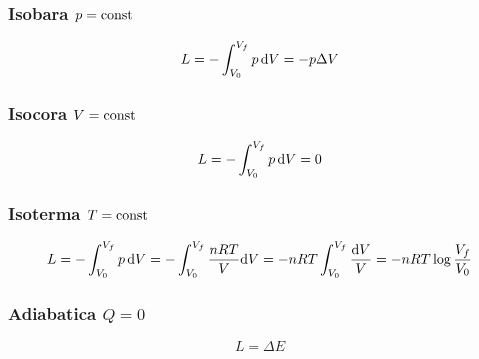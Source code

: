 \subsubsection{Isobara $p=\text{const}$}
\begin{equation}
L=-\int_{V_0}^{V_f} p\,\mathrm{d} V=-p\Delta V
\end{equation}
\subsubsection{Isocora $V=\text{const}$}
\begin{equation}
L=-\int_{V_0}^{V_f} p\,\mathrm{d} V=0
\end{equation}
\subsubsection{Isoterma $T=\text{const}$}
\begin{equation}
L=-\int_{V_0}^{V_f} p\,\mathrm{d} V=-\int_{V_0}^{V_f} \frac{nRT}{V}\mathrm{d} V=-nRT\int_{V_0}^{V_f} \frac{\mathrm{d} V}{V}=-nRT\log\frac{V_f}{V_0}
\end{equation}
\subsubsection{Adiabatica $Q=0$}
\begin{equation}
L=\Delta E
\end{equation}
